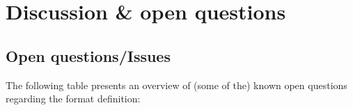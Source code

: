 \documentclass[a4paper,10pt,bibtotoc]{scrartcl}
\begin{document}
%
%
%
%
%



\clearpage
\appendix


\section{Discussion \& open questions}
\label{sec:discussion}

\subsection{Open questions/Issues}
\label{sec:open-questions}

The following table presents an overview of (some of the) known open
questions regarding the format definition:
\end{document}

